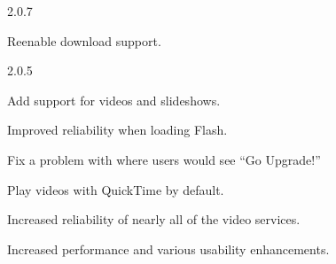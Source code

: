 \begin{changelog}{2.0.7}
\item Reenable  download support. 
\end{changelog}

\begin{changelog}{2.0.5}
\item Add support for  videos and slideshows.
\item Improved reliability when loading Flash. 
\item Fix a problem with  where users would see ``Go Upgrade!'' 
\item Play videos with QuickTime by default.
\item Increased reliability of nearly all of the video services.
\item Increased performance and various usability enhancements.
\end{changelog}
